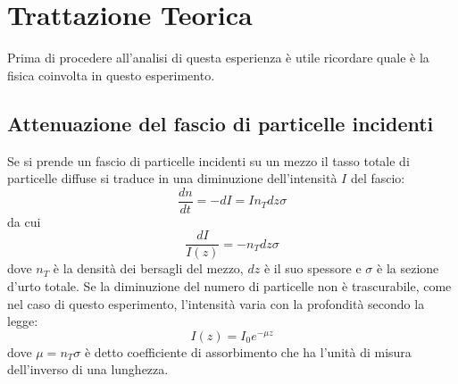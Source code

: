 \section{Trattazione Teorica}
Prima di procedere all'analisi di questa esperienza è utile ricordare quale è la fisica coinvolta in questo esperimento.
\subsection{Attenuazione del fascio di particelle incidenti}
Se si prende un fascio di particelle incidenti su un mezzo il tasso totale di particelle diffuse si traduce in una diminuzione dell'intensità $I$ del fascio:
\begin{equation}
    \frac{dn}{dt} = -dI = I n_{T} dz \sigma
\end{equation}
da cui
\begin{equation}
    \frac{dI}{I(z)} = - n_{T} dz \sigma
\end{equation}
dove $n_{T}$ è la densità dei bersagli del mezzo, $dz$ è il suo spessore e $\sigma$ è la sezione d'urto totale. Se la diminuzione del numero di particelle non è trascurabile, come nel caso di questo esperimento, l'intensità varia con la profondità secondo la legge:
\begin{equation}
    I(z) = I_{0} e^{-\mu z}
\label{eq attenuazione fascio}
\end{equation}
dove $\mu = n_{T} \sigma$ è detto coefficiente di assorbimento che ha l'unità di misura dell'inverso di una lunghezza.
